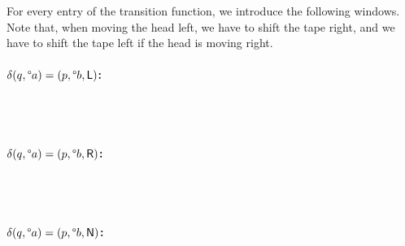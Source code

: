 \documentclass[a4paper,UKenglish,cleveref, autoref]{lipics-v2019}
\begin{document}
For every entry of the transition function, we introduce the following windows. Note that, when moving the head left, we have to shift the tape right, and we have to shift the tape left if the head is moving right.

\paragraph*{$\delta(q, \degree a) = (p, \degree b, \textsf{L})$:}
\begin{center}
   \\[3ex]
   \\[3ex]
\end{center}

\paragraph*{$\delta(q, \degree a) = (p, \degree b, \textsf{R})$:}
\begin{center}
   \\[3ex]
   \\[3ex]
\end{center}

\paragraph*{$\delta(q, \degree a) = (p, \degree b, \textsf{N})$:}
\begin{center}
   \\[3ex]
   \\[3ex]
\end{center}
\end{document}
